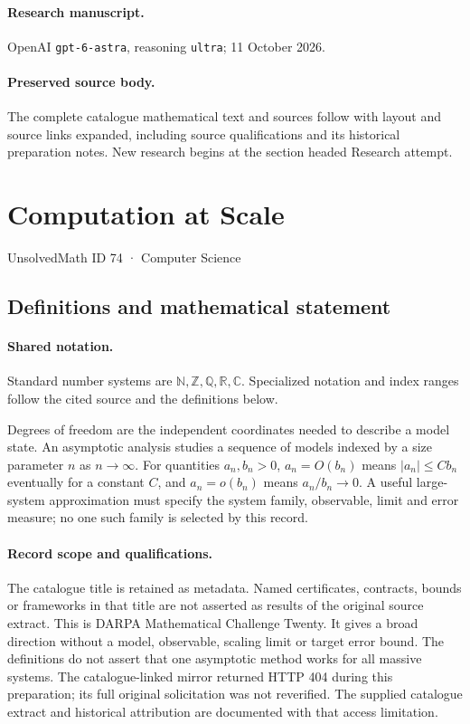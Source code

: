 \documentclass[11pt]{article}
\begin{document}
\paragraph{Research manuscript.} OpenAI \texttt{gpt-6-astra}, reasoning \texttt{ultra}; 11 October 2026.
\paragraph{Preserved source body.} The complete catalogue mathematical text and sources follow with layout and source links expanded, including source qualifications and its historical preparation notes. New research begins at the section headed Research attempt.

\section{Computation at Scale}\label{74}
{\small UnsolvedMath ID 74 · Computer Science}
\subsection{Definitions and mathematical statement}

\paragraph{Shared notation.}Standard number systems are $\mathbb N,\mathbb Z,\mathbb Q,\mathbb R,\mathbb C$. Specialized notation and index ranges follow the cited source and the definitions below.


Degrees of freedom are the independent coordinates needed to describe a model state. An asymptotic analysis studies a sequence of models indexed by a size parameter $n$ as $n\to\infty$. For quantities $a_n,b_n>0$, $a_n=O(b_n)$ means $|a_n|\leq Cb_n$ eventually for a constant $C$, and $a_n=o(b_n)$ means $a_n/b_n\to0$. A useful large-system approximation must specify the system family, observable, limit and error measure; no one such family is selected by this record.
\paragraph{Record scope and qualifications.}
The catalogue title is retained as metadata. Named certificates, contracts, bounds or frameworks in that title are not asserted as results of the original source extract.
This is DARPA Mathematical Challenge Twenty. It gives a broad direction without a model, observable, scaling limit or target error bound. The definitions do not assert that one asymptotic method works for all massive systems. The catalogue-linked mirror returned HTTP 404 during this preparation; its full original solicitation was not reverified. The supplied catalogue extract and historical attribution are documented with that access limitation.
\end{document}
